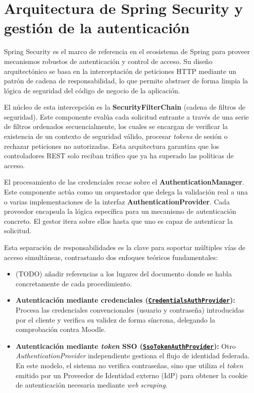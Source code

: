 
\section{Arquitectura de Spring Security y gestión de la autenticación}

Spring Security es el marco de referencia en el ecosistema de Spring para proveer mecanismos robustos de autenticación y control de acceso. Su diseño arquitectónico se basa en la interceptación de peticiones HTTP mediante un patrón de cadena de responsabilidad, lo que permite abstraer de forma limpia la lógica de seguridad del código de negocio de la aplicación.

El núcleo de esta intercepción es la \textbf{SecurityFilterChain} (cadena de filtros de seguridad). Este componente evalúa cada solicitud entrante a través de una serie de filtros ordenados secuencialmente, los cuales se encargan de verificar la existencia de un contexto de seguridad válido, procesar \textit{tokens} de sesión o rechazar peticiones no autorizadas. Esta arquitectura garantiza que los controladores REST solo reciban tráfico que ya ha superado las políticas de acceso.

El procesamiento de las credenciales recae sobre el \textbf{AuthenticationManager}. Este componente actúa como un orquestador que delega la validación real a una o varias implementaciones de la interfaz \textbf{AuthenticationProvider}. Cada proveedor encapsula la lógica específica para un mecanismo de autenticación concreto. El gestor itera sobre ellos hasta que uno es capaz de autenticar la solicitud.

Esta separación de responsabilidades es la clave para soportar múltiples vías de acceso simultáneas, contrastando dos enfoques teóricos fundamentales:
\begin{itemize}
    \item (TODO) añadir referencias a los lugares del documento donde se habla concretamente de cada procedimiento.

    \item \textbf{Autenticación mediante credenciales (\href{https://github.com/verteramo/UBUMonitorWeb/blob/main/api/src/main/kotlin/es/ubu/lsi/ubumonitorweb/core/security/CredentialsAuthProvider.kt\#L26}{\texttt{CredentialsAuthProvider}}):} Procesa las credenciales convencionales (usuario y contraseña) introducidas por el cliente y verifica su validez de forma síncrona, delegando la comprobación contra Moodle.
    
    \item \textbf{Autenticación mediante \textit{token} SSO (\href{https://github.com/verteramo/UBUMonitorWeb/blob/05b1a58966ce6891e093e1e0bb836a60f6edd3a6/api/src/main/kotlin/es/ubu/lsi/ubumonitorweb/core/security/SsoTokenAuthProvider.kt\#L21}{\texttt{SsoTokenAuthProvider}}):} Otro \textit{AuthenticationProvider} independiente gestiona el flujo de identidad federada. En este modelo, el sistema no verifica contraseñas, sino que utiliza el \textit{token} emitido por un Proveedor de Identidad externo (IdP) para obtener la cookie de autenticación necesaria mediante \textit{web scraping}.
\end{itemize}

